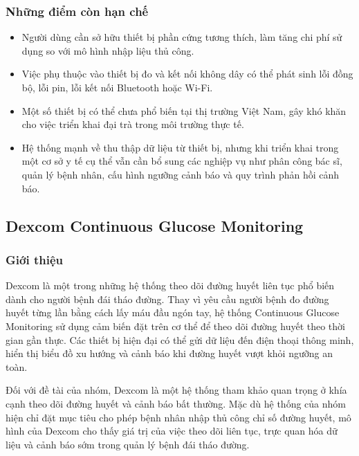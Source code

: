 \subsubsection{Những điểm còn hạn chế}
\begin{itemize}
    \item Người dùng cần sở hữu thiết bị phần cứng tương thích, làm tăng chi phí sử dụng so với mô hình nhập liệu thủ công.
    \item Việc phụ thuộc vào thiết bị đo và kết nối không dây có thể phát sinh lỗi đồng bộ, lỗi pin, lỗi kết nối Bluetooth hoặc Wi-Fi.
    \item Một số thiết bị có thể chưa phổ biến tại thị trường Việt Nam, gây khó khăn cho việc triển khai đại trà trong môi trường thực tế.
    \item Hệ thống mạnh về thu thập dữ liệu từ thiết bị, nhưng khi triển khai trong một cơ sở y tế cụ thể vẫn cần bổ sung các nghiệp vụ như phân công bác sĩ, quản lý bệnh nhân, cấu hình ngưỡng cảnh báo và quy trình phản hồi cảnh báo.
\end{itemize}

\subsection{Dexcom Continuous Glucose Monitoring}

\subsubsection{Giới thiệu}
\par Dexcom là một trong những hệ thống theo dõi đường huyết liên tục phổ biến dành cho người bệnh đái tháo đường. Thay vì yêu cầu người bệnh đo đường huyết từng lần bằng cách lấy máu đầu ngón tay, hệ thống Continuous Glucose Monitoring sử dụng cảm biến đặt trên cơ thể để theo dõi đường huyết theo thời gian gần thực. Các thiết bị hiện đại có thể gửi dữ liệu đến điện thoại thông minh, hiển thị biểu đồ xu hướng và cảnh báo khi đường huyết vượt khỏi ngưỡng an toàn. \cite{dexcomCGM}

\par Đối với đề tài của nhóm, Dexcom là một hệ thống tham khảo quan trọng ở khía cạnh theo dõi đường huyết và cảnh báo bất thường. Mặc dù hệ thống của nhóm hiện chỉ đặt mục tiêu cho phép bệnh nhân nhập thủ công chỉ số đường huyết, mô hình của Dexcom cho thấy giá trị của việc theo dõi liên tục, trực quan hóa dữ liệu và cảnh báo sớm trong quản lý bệnh đái tháo đường.

